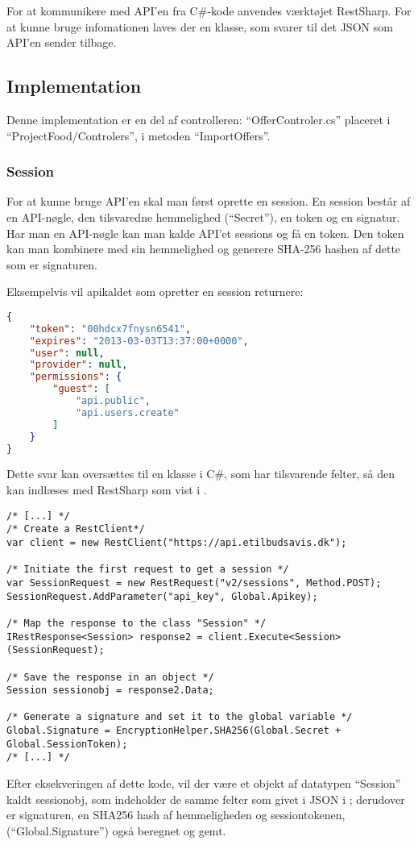 For at kommunikere med API'en fra C\#-kode anvendes værktøjet RestSharp. \citep{RestSharp}
For at kunne bruge infomationen laves der en klasse, som svarer til det JSON som API'en sender tilbage.


\subsection{Implementation}
Denne implementation er en del af controlleren: ``OfferControler.cs'' placeret i ``ProjectFood/Controlers'', i metoden ``ImportOffers''.
\subsubsection{Session}
For at kunne bruge API'en skal man først oprette en session.
En session består af en API-nøgle, den tilsvaredne hemmelighed (``Secret''), en token og en signatur.
Har man en API-nøgle kan man kalde API'et sessions og få en token.
Den token kan man kombinere med sin hemmelighed og generere SHA-256 hashen af dette som er signaturen.

Eksempelvis vil apikaldet som opretter en session returnere:
\begin{lstlisting}[language=json,firstnumber=1,caption="POST til sessions api'en med APIKEYen",label=apilst1]
{
    "token": "00hdcx7fnysn6541",
    "expires": "2013-03-03T13:37:00+0000",
    "user": null,
    "provider": null,
    "permissions": {
        "guest": [
            "api.public",
            "api.users.create"
        ]
    }
}
\end{lstlisting}

Dette svar kan oversættes til en klasse i C\#, som har tilsvarende felter, så den kan indlæses med RestSharp som vist i .

\begin{lstlisting}[caption="C\#-kode som opretter en RestClient og anvender den til at oprette et objekt med felter som svarer til JSON dataet givet fra API'en", label=lst:session]
/* [...] */
/* Create a RestClient*/
var client = new RestClient("https://api.etilbudsavis.dk");

/* Initiate the first request to get a session */
var SessionRequest = new RestRequest("v2/sessions", Method.POST);
SessionRequest.AddParameter("api_key", Global.Apikey);

/* Map the response to the class "Session" */
IRestResponse<Session> response2 = client.Execute<Session>(SessionRequest);

/* Save the response in an object */
Session sessionobj = response2.Data;

/* Generate a signature and set it to the global variable */
Global.Signature = EncryptionHelper.SHA256(Global.Secret + Global.SessionToken);
/* [...] */
\end{lstlisting}
Efter eksekveringen af dette kode, vil der være et objekt af datatypen ``Session'' kaldt sessionobj, som indeholder de samme felter som givet i JSON i ; derudover er signaturen, en SHA256 hash af hemmeligheden og sessiontokenen, (``Global.Signature'') også beregnet og gemt.

